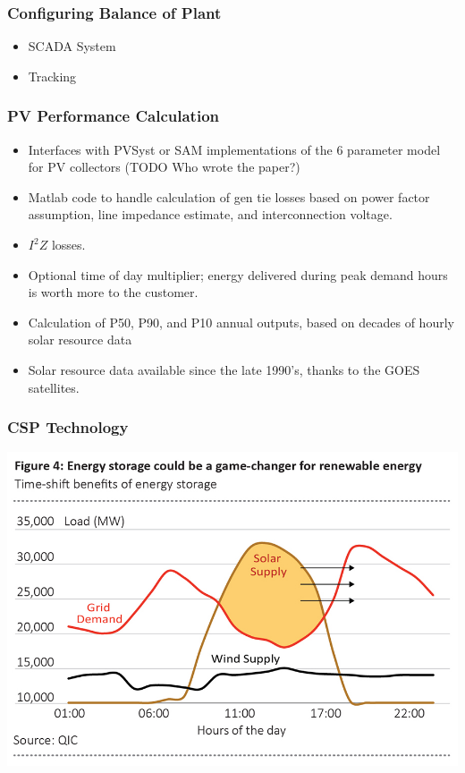 \documentclass[aspectratio=169]{beamer}
\begin{document}
\begin{frame}
  \frametitle{Configuring Balance of Plant}
  \begin{itemize}
    \item SCADA System
    \item Tracking
  \end{itemize}
\end{frame}

\begin{frame}
  \frametitle{PV Performance Calculation}
  \begin{itemize}
    \item Interfaces with PVSyst or SAM implementations of the 6 parameter model for PV collectors (TODO Who wrote the paper?)
  \item Matlab code to handle calculation of gen tie losses based on
    power factor assumption, line impedance estimate, and
    interconnection voltage.
  \item $I^{2}Z$ losses.
  \item Optional time of day multiplier; energy delivered during peak
    demand hours is worth more to the customer.
  \item Calculation of P50, P90, and P10 annual outputs, based on
    decades of hourly solar resource data
  \item Solar resource data available since the late 1990's, thanks to the GOES satellites. %
  \end{itemize}
\end{frame}

\begin{frame}
  \frametitle{CSP Technology}
  \includegraphics[width=\linewidth]{SolarEnergyStorage.jpg}
\end{frame}
  
\end{document}
